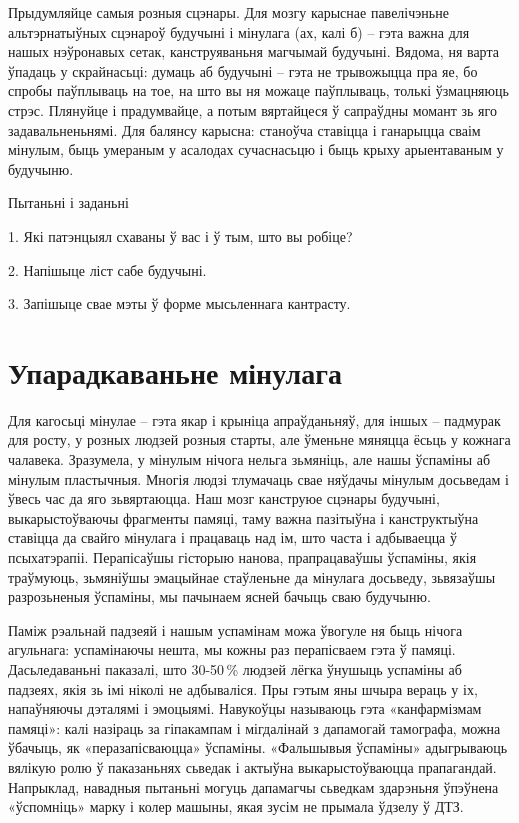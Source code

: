 Прыдумляйце самыя розныя сцэнары. Для мозгу карыснае павелічэньне альтэрнатыўных сцэнароў будучыні і мінулага (ах, калі б) – гэта важна для нашых нэўронавых сетак, канструяваньня магчымай будучыні. Вядома, ня варта ўпадаць у скрайнасьці: думаць аб будучыні – гэта не трывожыцца пра яе, бо спробы паўплываць на тое, на што вы ня можаце паўплываць, толькі ўзмацняюць стрэс. Плянуйце і прадумвайце, а потым вяртайцеся ў сапраўдны момант зь яго задавальненьнямі. Для балянсу карысна: станоўча ставіцца і ганарыцца сваім мінулым, быць умераным у асалодах сучаснасьцю і быць крыху арыентаваным у будучыню.

Пытаньні і заданьні

1. Які патэнцыял схаваны ў вас і ў тым, што вы робіце?

2. Напішыце ліст сабе будучыні.

3. Запішыце свае мэты ў форме мысьленнага кантрасту.


\section{Упарадкаваньне мінулага}

Для кагосьці мінулае – гэта якар і крыніца апраўданьняў, для іншых – падмурак для росту, у розных людзей розныя старты, але ўменьне мяняцца ёсьць у кожнага чалавека. Зразумела, у мінулым нічога нельга зьмяніць, але нашы ўспаміны аб мінулым пластычныя. Многія людзі тлумачаць свае няўдачы мінулым досьведам і ўвесь час да яго зьвяртаюцца. Наш мозг канструюе сцэнары будучыні, выкарыстоўваючы фрагменты памяці, таму важна пазітыўна і канструктыўна ставіцца да свайго мінулага і працаваць над ім, што часта і адбываецца ў псыхатэрапіі. Перапісаўшы гісторыю нанова, прапрацаваўшы ўспаміны, якія траўмуюць, зьмяніўшы эмацыйнае стаўленьне да мінулага досьведу, зьвязаўшы разрозьненыя ўспаміны, мы пачынаем ясней бачыць сваю будучыню.

Паміж рэальнай падзеяй і нашым успамінам можа ўвогуле ня быць нічога агульнага: успамінаючы нешта, мы кожны раз перапісваем гэта ў памяці. Дасьледаваньні паказалі, што 30-50\,\% людзей лёгка ўнушыць успаміны аб падзеях, якія зь імі ніколі не адбываліся. Пры гэтым яны шчыра вераць у іх, напаўняючы дэталямі і эмоцыямі. Навукоўцы называюць гэта «канфармізмам памяці»: калі назіраць за гіпакампам і мігдалінай з дапамогай тамографа, можна ўбачыць, як «перазапісваюцца» ўспаміны. «Фальшывыя ўспаміны» адыгрываюць вялікую ролю ў паказаньнях сьведак і актыўна выкарыстоўваюцца прапагандай. Напрыклад, навадныя пытаньні могуць дапамагчы сьведкам здарэньня ўпэўнена «ўспомніць» марку і колер машыны, якая зусім не прымала ўдзелу ў ДТЗ.

